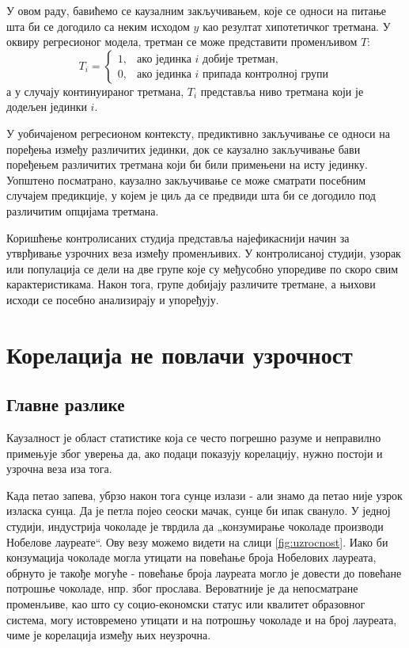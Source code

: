 \documentclass[12pt, a4paper]{article}
\begin{document}
У овом раду, бавићемо се каузалним закључивањем, које се односи на питање шта би се догодило са неким исходом $y$ као резултат хипотетичког третмана.
У оквиру регресионог модела, третман се може представити променљивом $T$:
$$
T_i =
\begin{cases}
1, & \text{ако јединка } i \text{ добије третман},\\
0, & \text{ако јединка } i \text{ припада контролној групи}
\end{cases}
$$
а у случају континуираног третмана, $T_i$ представља ниво третмана који је додељен јединки $i$.

У уобичајеном регресионом контексту, предиктивно закључивање се односи на поређења између различитих јединки, док се каузално закључивање бави 
поређењем различитих третмана који би били примењени на исту јединку. Уопштено посматрано, каузално закључивање се може сматрати посебним случајем предикције, 
у којем је циљ да се предвиди шта би се догодило под различитим опцијама третмана.

Коришћење контролисаних студија представља најефикаснији начин за утврђивање узрочних веза између променљивих. У контролисаној студији, узорак или популација 
се дели на две групе које су међусобно упоредиве по скоро свим карактеристикама. Након тога, групе добијају различите третмане, а њихови исходи се посебно 
анализирају и упоређују.

\section{Корелација не повлачи узрочност}
\subsection{Главне разлике}
Каузалност је област статистике која се често погрешно разуме и неправилно примењује због уверења да, ако подаци показују корелацију, 
нужно постоји и узрочна веза иза тога.

Када петао запева, убрзо након тога сунце излази - али знамо да петао није узрок изласка сунца. Да је петла појео сеоски мачак, сунце би ипак свануло.
У једној студији, индустрија чоколаде је тврдила да „конзумирање чоколаде производи Нобелове лауреате“\cite{nobel}. Ову везу можемо видети на слици \ref{fig:uzrocnost}. Иако би конзумација чоколаде могла утицати на повећање броја Нобелових лауреата, обрнуто је такође могуће - повећање броја лауреата могло је довести до повећане потрошње чоколаде, нпр. због прослава. Вероватније је да непосматране променљиве, као што су социо-економски статус или квалитет образовног система, могу истовремено утицати и на потрошњу чоколаде и на број лауреата, чиме је корелација између њих неузрочна.
\end{document}
